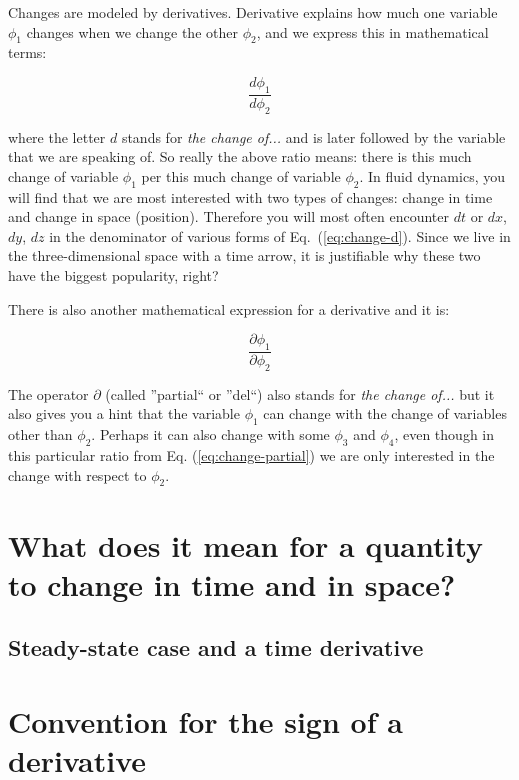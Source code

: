 Changes are modeled by derivatives. Derivative explains how much one variable $\phi_1$ changes when we change the other $\phi_2$, and we express this in mathematical terms:

\begin{equation}\label{eq:change-d}
\frac{d \phi_1}{d \phi_2}
\end{equation}

where the letter $d$ stands for \textit{the change of...} and is later followed by the variable that we are speaking of. So really the above ratio means: there is this much change of variable $\phi_1$ per this much change of variable $\phi_2$. In fluid dynamics, you will find that we are most interested with two types of changes: change in time and change in space (position). Therefore you will most often encounter $dt$ or $dx$, $dy$, $dz$ in the denominator of various forms of Eq.~(\ref{eq:change-d}). Since we live in the three-dimensional space with a time arrow, it is justifiable why these two have the biggest popularity, right?

There is also another mathematical expression for a derivative and it is:

\begin{equation}\label{eq:change-partial}
\frac{\partial \phi_1}{\partial \phi_2}
\end{equation}

The operator $\partial$ (called ''partial`` or ''del``) also stands for \textit{the change of...} but it also gives you a hint that the variable $\phi_1$ can change with the change of variables other than $\phi_2$. Perhaps it can also change with some $\phi_3$ and $\phi_4$, even though in this particular ratio from Eq. (\ref{eq:change-partial}) we are only interested in the change with respect to $\phi_2$.

\section{What does it mean for a quantity to change in time and in space?}


\subsection{Steady-state case and a time derivative}

\section{Convention for the sign of a derivative}

